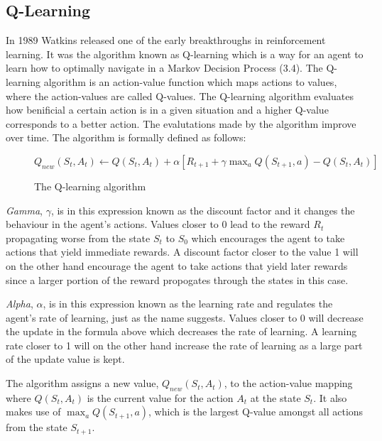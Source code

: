 \documentclass[titlepage]{article}
\begin{document}
\subsection{Q-Learning}

\vskip 0.2cm
In 1989 Watkins \cite{sutton} released one of the early breakthroughs in reinforcement learning. It was the algorithm known as Q-learning which is a way for an agent to learn how to optimally navigate in a Markov Decision Process (3.4). The Q-learning algorithm is an action-value function which maps actions to values, where the action-values are called Q-values. The Q-learning algorithm evaluates how benificial a certain action is in a given situation and a higher Q-value corresponds to a better action. The evalutations made by the algorithm improve over time. The algorithm \cite{sutton} is formally defined as follows:

\vskip 0.5cm

\begin{figure}[h]
    \centerline{$Q_{new}(S_{t}, A_{t}) \leftarrow Q(S_{t}, A_{t}) + \alpha[R_{t+1} + \gamma\max_{a}Q(S_{t+1}, a) - Q(S_{t}, A_{t})]$}
    \vskip 0.2cm
    \caption{The Q-learning algorithm}
\end{figure}

\vskip 0.3cm

\noindent
\emph{Gamma}, $\gamma$, is in this expression known as the discount factor and it changes the behaviour in the agent's actions. Values closer to 0 lead to the reward $R_{t}$ propagating worse from the state $S_{t}$ to $S_{0}$ which encourages the agent to take actions that yield immediate rewards. A discount factor closer to the value 1 will on the other hand encourage the agent to take actions that yield later rewards since a larger portion of the reward propogates through the states in this case. 

\vskip 0.3cm

\noindent
\emph{Alpha}, $\alpha$, is in this expression known as the learning rate and regulates the agent's rate of learning, just as the name suggests. Values closer to 0 will decrease the update in the formula above which decreases the rate of learning. A learning rate closer to 1 will on the other hand increase the rate of learning as a large part of the update value is kept. 

\vskip 0.3cm

\noindent
The algorithm assigns a new value, $Q_{new}(S_{t}, A_{t})$, to the action-value mapping where $Q(S_{t}, A_{t})$ is the current value for the action $A_{t}$ at the state $S_{t}$. It also makes use of $\max_{a}Q(S_{t+1}, a)$, which is the largest Q-value amongst all actions from the state $S_{t+1}$. 
\end{document}
